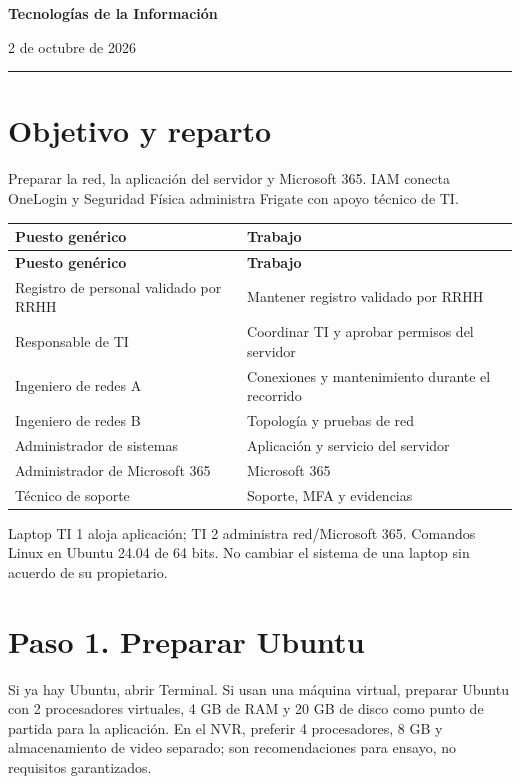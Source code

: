 \documentclass[12pt,a4paper]{article}
\begin{document}
{\LARGE\bfseries Tecnologías de la Información\par}\vspace{6pt}
2 de octubre de 2026\par\hrule\vspace{10pt}
\section*{Objetivo y reparto}
Preparar la red, la aplicación del servidor y Microsoft 365. IAM conecta OneLogin y Seguridad Física administra Frigate con apoyo técnico de TI.\par
{\small\renewcommand{\arraystretch}{1.2}
\begin{longtable}{p{7.760cm}p{7.760cm}}
\toprule
\textbf{Puesto genérico} & \textbf{Trabajo} \\ \midrule\endfirsthead
\textbf{Puesto genérico} & \textbf{Trabajo} \\ \midrule\endhead
Registro de personal validado por RRHH & Mantener registro validado por RRHH \\
Responsable de TI & Coordinar TI y aprobar permisos del servidor \\
Ingeniero de redes A & Conexiones y mantenimiento durante el recorrido \\
Ingeniero de redes B & Topología y pruebas de red \\
Administrador de sistemas & Aplicación y servicio del servidor \\
Administrador de Microsoft 365 & Microsoft 365 \\
Técnico de soporte & Soporte, MFA y evidencias \\
\bottomrule\end{longtable}}
Laptop TI 1 aloja aplicación; TI 2 administra red/Microsoft 365. Comandos Linux en Ubuntu 24.04 de 64 bits. No cambiar el sistema de una laptop sin acuerdo de su propietario.\par
{}\section*{Paso 1. Preparar Ubuntu}
Si ya hay Ubuntu, abrir Terminal. Si usan una máquina virtual, preparar Ubuntu con 2 procesadores virtuales, 4 GB de RAM y 20 GB de disco como punto de partida para la aplicación. En el NVR, preferir 4 procesadores, 8 GB y almacenamiento de video separado; son recomendaciones para ensayo, no requisitos garantizados.\par
\end{document}
